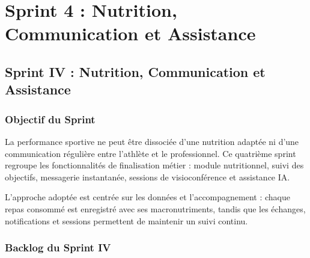\chapter{Sprint 4 : Nutrition, Communication et Assistance}
\minitoc
\newpage

\section{Sprint IV : Nutrition, Communication et Assistance}

\subsection{Objectif du Sprint}
La performance sportive ne peut être dissociée d'une nutrition adaptée ni d'une communication régulière entre l'athlète et le professionnel. Ce quatrième sprint regroupe les fonctionnalités de finalisation métier : module nutritionnel, suivi des objectifs, messagerie instantanée, sessions de visioconférence et assistance IA.

L'approche adoptée est centrée sur les données et l'accompagnement : chaque repas consommé est enregistré avec ses macronutriments, tandis que les échanges, notifications et sessions permettent de maintenir un suivi continu.

\subsection{Backlog du Sprint IV}

